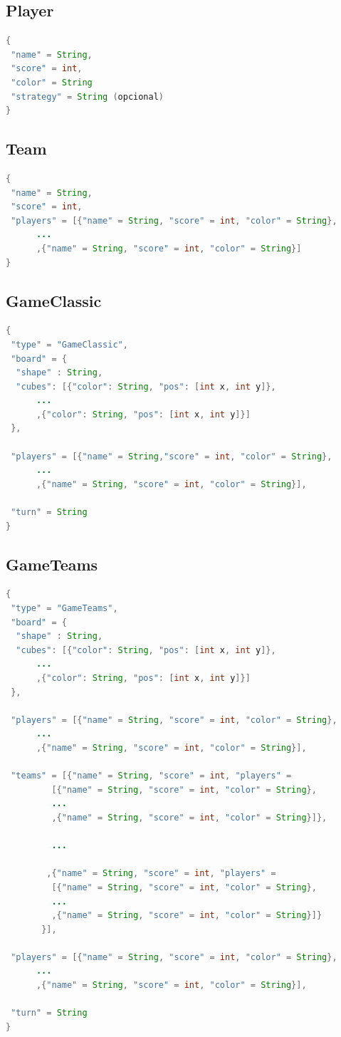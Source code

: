 \documentclass[../DocumentoOficial.tex]{subfiles}
\begin{document}
\subsection*{Player}

\begin{lstlisting}[frame=single, language=Java]
{
 "name" = String,
 "score" = int,
 "color" = String
 "strategy" = String (opcional)
}
\end{lstlisting}

\subsection*{Team}

\begin{lstlisting}[frame=single, language=Java]
{
 "name" = String,
 "score" = int,
 "players" = [{"name" = String, "score" = int, "color" = String},
 	  ...
 	  ,{"name" = String, "score" = int, "color" = String}]
}
\end{lstlisting}

\newpage

\subsection*{GameClassic}
\begin{lstlisting}[frame=single, language=Java]
{
 "type" = "GameClassic",
 "board" = {
  "shape" : String,
  "cubes": [{"color": String, "pos": [int x, int y]},
  	  ...
  	  ,{"color": String, "pos": [int x, int y]}]
 },
 
 "players" = [{"name" = String,"score" = int, "color" = String},
 	  ...
 	  ,{"name" = String, "score" = int, "color" = String}],
 
 "turn" = String	
}
\end{lstlisting}

\subsection*{GameTeams}
\begin{lstlisting}[frame=single, language=Java]
{
 "type" = "GameTeams",
 "board" = {
  "shape" : String,
  "cubes": [{"color": String, "pos": [int x, int y]},
  	  ...
  	  ,{"color": String, "pos": [int x, int y]}]
 },
 
 "players" = [{"name" = String, "score" = int, "color" = String},
 	  ...
 	  ,{"name" = String, "score" = int, "color" = String}],
 
 "teams" = [{"name" = String, "score" = int, "players" = 
 	     [{"name" = String, "score" = int, "color" = String},
 	     ...
 	     ,{"name" = String, "score" = int, "color" = String}]},
 	     
 	     ...
 	     
 	    ,{"name" = String, "score" = int, "players" = 
 	     [{"name" = String, "score" = int, "color" = String},
 	     ...
 	     ,{"name" = String, "score" = int, "color" = String}]}
	   }],
	   
 "players" = [{"name" = String, "score" = int, "color" = String},
 	  ...
 	  ,{"name" = String, "score" = int, "color" = String}],
 
 "turn" = String	
}
\end{lstlisting}
\end{document}
